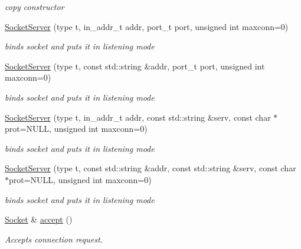 \begin{CompactItemize}
\begin{CompactList}\small\item\em copy constructor \item\end{CompactList}\item 
\hyperlink{classsocketpp_1_1SocketServer_73c5125f9e5a6cf03dc15f6d4250e345}{SocketServer} (type t, in\_\-addr\_\-t addr, port\_\-t port, unsigned int maxconn=0)
\begin{CompactList}\small\item\em binds socket and puts it in listening mode \item\end{CompactList}\item 
\hyperlink{classsocketpp_1_1SocketServer_2b43397fd614dc7953559d7372f1c6ca}{SocketServer} (type t, const std::string \&addr, port\_\-t port, unsigned int maxconn=0)
\begin{CompactList}\small\item\em binds socket and puts it in listening mode \item\end{CompactList}\item 
\hyperlink{classsocketpp_1_1SocketServer_594f3a739f4cd053f9fd0512e42473be}{SocketServer} (type t, in\_\-addr\_\-t addr, const std::string \&serv, const char $\ast$prot=NULL, unsigned int maxconn=0)
\begin{CompactList}\small\item\em binds socket and puts it in listening mode \item\end{CompactList}\item 
\hyperlink{classsocketpp_1_1SocketServer_667f8c2b7b1325c80f018ecf85a9551f}{SocketServer} (type t, const std::string \&addr, const std::string \&serv, const char $\ast$prot=NULL, unsigned int maxconn=0)
\begin{CompactList}\small\item\em binds socket and puts it in listening mode \item\end{CompactList}\item 
\hyperlink{classsocketpp_1_1Socket}{Socket} \& \hyperlink{classsocketpp_1_1SocketServer_de24bd723d353d62d034718a1d95c02f}{accept} ()
\begin{CompactList}\small\item\em Accepts connection request. \item\end{CompactList}\item 

\end{CompactItemize}
